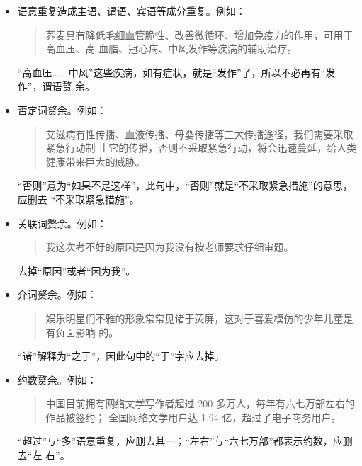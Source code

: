 \documentclass[final,oneside]{ctexbook}
\newenvironment{equotation}{\begin{quotation}\kaishu}{\end{quotation}}
\begin{document}
\begin{itemize}
  \item 语意重复造成主语、谓语、宾语等成分重复。例如：

    \begin{equotation}
      荞麦具有降低毛细血管脆性、改善微循环、增加免疫力的作用，可用于高血压、高
      血脂、冠心病、中风发作等疾病的辅助治疗。
    \end{equotation}

    “高血压…… 中风”这些疾病，如有症状，就是“发作”了，所以不必再有“发作”，谓语赘
    余。

  \item 否定词赘余。例如：

    \begin{equotation}
      艾滋病有性传播、血液传播、母婴传播等三大传播途径，我们需要采取紧急行动制
      止它的传播，否则不采取紧急行动，将会迅速蔓延，给人类健康带来巨大的威胁。
    \end{equotation}

    “否则”意为“如果不是这样”，此句中，“否则”就是“不采取紧急措施”的意思，应删去
    “不采取紧急措施”。

  \item 关联词赘余。例如：

    \begin{equotation}
      我这次考不好的原因是因为我没有按老师要求仔细审题。
    \end{equotation}

    去掉“原因”或者“因为我”。

  \item 介词赘余。例如：

    \begin{equotation}
      娱乐明星们不雅的形象常常见诸于荧屏，这对于喜爱模仿的少年儿童是有负面影响
      的。
    \end{equotation}

    “诸”解释为“之于”，因此句中的“于”字应去掉。

  \item 约数赘余。例如：

    \begin{equotation}
      中国目前拥有网络文学写作者超过 200 多万人，每年有六七万部左右的作品被签约；
      全国网络文学用户达 1.94 亿，超过了电子商务用户。
    \end{equotation}

    “超过”与“多”语意重复，应删去其一；“左右”与“六七万部”都表示约数，应删去“左
    右”。
\end{itemize}
\end{document}
